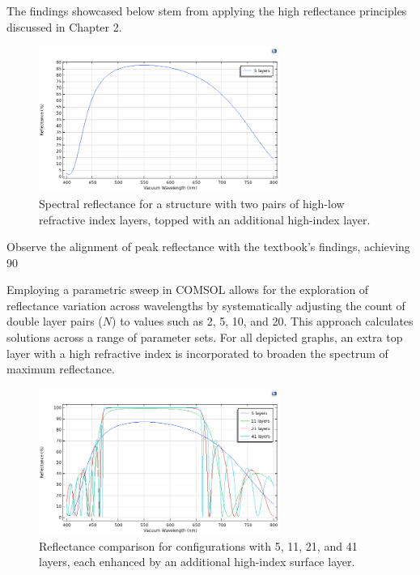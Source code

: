 The findings showcased below stem from applying the high reflectance principles discussed in Chapter 2.

\begin{figure}[H]
  \centering
  \includegraphics[width=0.7\textwidth]{Chapters/Figures/Chapter 4 Figures/High-Reflectance (5 Layers).png}
  \caption{Spectral reflectance for a structure with two pairs of high-low refractive index layers, topped with an additional high-index layer.}
  \label{fig:Reflectance 5-layer structure}
\end{figure}

Observe the alignment of peak reflectance with the textbook's findings, achieving 90%

Employing a parametric sweep in COMSOL allows for the exploration of reflectance variation across wavelengths by systematically adjusting the count of double layer pairs ($N$) to values such as 2, 5, 10, and 20. This approach calculates solutions across a range of parameter sets. For all depicted graphs, an extra top layer with a high refractive index is incorporated to broaden the spectrum of maximum reflectance.

\begin{figure}[H]
  \centering
  \includegraphics[width=0.7\textwidth]{Chapters/Figures/Chapter 4 Figures/High-Reflectance (5, 11, 21, and 41 Layers).png}
  \caption{Reflectance comparison for configurations with 5, 11, 21, and 41 layers, each enhanced by an additional high-index surface layer.}
  \label{fig:COMSOL multi-layer reflectance results}
\end{figure}

